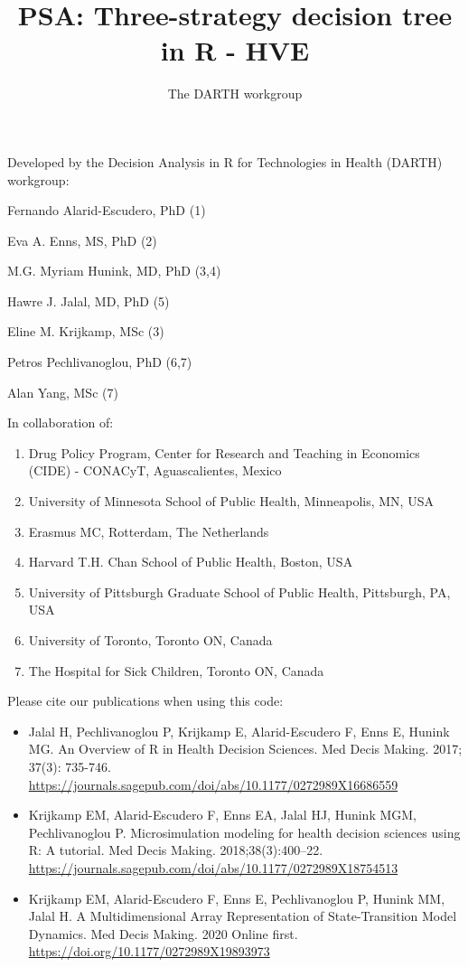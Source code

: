 \documentclass[
]{article}
\title{PSA: Three-strategy decision tree in R - HVE}
\author{The DARTH workgroup}
\date{}
\providecommand{\tightlist}{%
  \setlength{\itemsep}{0pt}\setlength{\parskip}{0pt}}
\begin{document}
\maketitle

Developed by the Decision Analysis in R for Technologies in Health
(DARTH) workgroup:

Fernando Alarid-Escudero, PhD (1)

Eva A. Enns, MS, PhD (2)

M.G. Myriam Hunink, MD, PhD (3,4)

Hawre J. Jalal, MD, PhD (5)

Eline M. Krijkamp, MSc (3)

Petros Pechlivanoglou, PhD (6,7)

Alan Yang, MSc (7)

In collaboration of:

\begin{enumerate}
\def\labelenumi{\arabic{enumi}.}
\tightlist
\item
  Drug Policy Program, Center for Research and Teaching in Economics
  (CIDE) - CONACyT, Aguascalientes, Mexico
\item
  University of Minnesota School of Public Health, Minneapolis, MN, USA
\item
  Erasmus MC, Rotterdam, The Netherlands
\item
  Harvard T.H. Chan School of Public Health, Boston, USA
\item
  University of Pittsburgh Graduate School of Public Health, Pittsburgh,
  PA, USA
\item
  University of Toronto, Toronto ON, Canada
\item
  The Hospital for Sick Children, Toronto ON, Canada
\end{enumerate}

Please cite our publications when using this code:

\begin{itemize}
\item
  Jalal H, Pechlivanoglou P, Krijkamp E, Alarid-Escudero F, Enns E,
  Hunink MG. An Overview of R in Health Decision Sciences. Med Decis
  Making. 2017; 37(3): 735-746.
  \url{https://journals.sagepub.com/doi/abs/10.1177/0272989X16686559}
\item
  Krijkamp EM, Alarid-Escudero F, Enns EA, Jalal HJ, Hunink MGM,
  Pechlivanoglou P. Microsimulation modeling for health decision
  sciences using R: A tutorial. Med Decis Making. 2018;38(3):400--22.
  \url{https://journals.sagepub.com/doi/abs/10.1177/0272989X18754513}
\item
  Krijkamp EM, Alarid-Escudero F, Enns E, Pechlivanoglou P, Hunink MM,
  Jalal H. A Multidimensional Array Representation of State-Transition
  Model Dynamics. Med Decis Making. 2020 Online first.
  \url{https://doi.org/10.1177/0272989X19893973}
\end{itemize}
\end{document}
